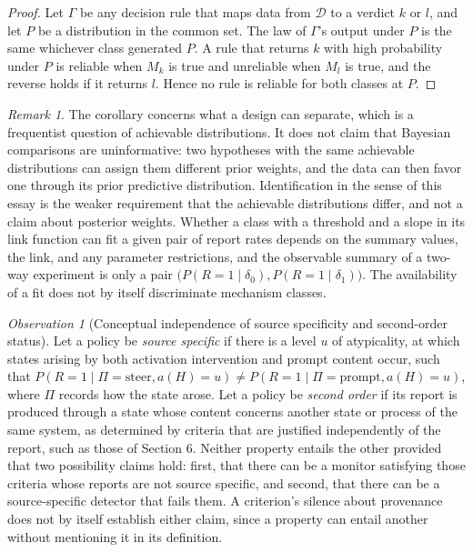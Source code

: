 \documentclass[11pt]{article}
\theoremstyle{definition}
\theoremstyle{remark}
\newtheorem{remark}{Remark}
\newtheorem{observation}{Observation}
\begin{document}
\begin{proof}
Let $\Gamma$ be any decision rule that maps data from $\mathcal{D}$ to a verdict $k$ or $l$, and let $P$ be a distribution in the common set. The law of $\Gamma$'s output under $P$ is the same whichever class generated $P$. A rule that returns $k$ with high probability under $P$ is reliable when $M_k$ is true and unreliable when $M_l$ is true, and the reverse holds if it returns $l$. Hence no rule is reliable for both classes at $P$.
\end{proof}

\begin{remark}
The corollary concerns what a design can separate, which is a frequentist question of achievable distributions. It does not claim that Bayesian comparisons are uninformative: two hypotheses with the same achievable distributions can assign them different prior weights, and the data can then favor one through its prior predictive distribution. Identification in the sense of this essay is the weaker requirement that the achievable distributions differ, and not a claim about posterior weights. Whether a class with a threshold and a slope in its link function can fit a given pair of report rates depends on the summary values, the link, and any parameter restrictions, and the observable summary of a two-way experiment is only a pair $\bigl(P(R=1\mid\delta_0),P(R=1\mid\delta_1)\bigr)$. The availability of a fit does not by itself discriminate mechanism classes.
\end{remark}

\begin{observation}[Conceptual independence of source specificity and second-order status]\label{prop:orth}
Let a policy be \emph{source specific} if there is a level $u$ of atypicality, at which states arising by both activation intervention and prompt content occur, such that $P(R=1\mid\Pi=\text{steer},a(H)=u)\neq P(R=1\mid\Pi=\text{prompt},a(H)=u)$, where $\Pi$ records how the state arose. Let a policy be \emph{second order} if its report is produced through a state whose content concerns another state or process of the same system, as determined by criteria that are justified independently of the report, such as those of Section 6. Neither property entails the other provided that two possibility claims hold: first, that there can be a monitor satisfying those criteria whose reports are not source specific, and second, that there can be a source-specific detector that fails them. A criterion's silence about provenance does not by itself establish either claim, since a property can entail another without mentioning it in its definition.
\end{observation}
\end{document}

